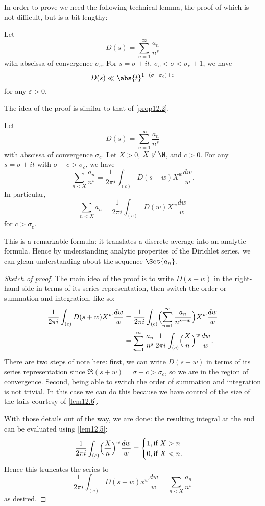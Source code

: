 In order to prove  we need the following technical lemma, the proof of which is not difficult, but is a bit lengthy:

\begin{lemma}\label{lem12.6}
	Let
	\[
		D(s) = \sum_{n = 1}^\infty \frac{a_n}{n^s}
	\]
	with abscissa of convergence $\sigma_c$.
	For $s = \sigma + i t$, $\sigma_c < \sigma < \sigma_c + 1$, we have
	\[
		D(s) \ll \abs{t}^{1 - (\sigma - \sigma_c) + \varepsilon}
	\]
	for any $\varepsilon > 0$.
\end{lemma}

The idea of the proof is similar to that of \autoref{prop12.2}.

\begin{theorem}\label{thm12.7}
	Let
	\[
		D(s) = \sum_{n = 1}^\infty \frac{a_n}{n^s}
	\]
	with abscissa of convergence $\sigma_c$.
	Let $X > 0$, $X \not\in \N$, and $c > 0$.
	For any $s = \sigma + i t$ with $\sigma + c > \sigma_c$, we have
	\[
		\sum_{n < X} \frac{a_n}{n^s} = \frac{1}{2 \pi i} \int_{(c)} D(s + w) X^w \frac{d w}{w}.
	\]
	In particular,
	\[
		\sum_{n < X} a_n = \frac{1}{2 \pi i} \int_{(c)} D(w) X^w \frac{d w}{w}
	\]
	for $c > \sigma_c$.
\end{theorem}

This is a remarkable formula: it translates a discrete average into an analytic formula.
Hence by understanding analytic properties of the Dirichlet series, we can glean understanding about the sequence $\Set{a_n}$.

\begin{proof}[Sketch of proof]
	The main idea of the proof is to write $D(s + w)$ in the right-hand side in terms of its series representation, then switch the order or summation and integration, like so:
	\begin{align*}
		\frac{1}{2 \pi i} \int_{(c)} D(s + w) X^w \frac{d w}{w} &= \frac{1}{2 \pi i} \int_{(c)} \Bigl( \sum_{n = 1}^\infty \frac{a_n}{n^{s + w}} \Bigr) X^w \frac{d w}{w} \\
		&= \sum_{n = 1}^\infty \frac{a_n}{n^s} \frac{1}{2 \pi i} \int_{(c)} \Bigl( \frac{X}{n} \Bigr)^w \frac{d w}{w}.
	\end{align*}
	There are two steps of note here: first, we can write $D(s + w)$ in terms of its series representation since $\Re(s + w) = \sigma + c > \sigma_c$, so we are in the region of convergence.
	Second, being able to switch the order of summation and integration is not trivial.
	In this case we can do this because we have control of the size of the tails courtesy of \autoref{lem12.6}.

	With those details out of the way, we are done: the resulting integral at the end can be evaluated using \autoref{lem12.5}:
	\[
		\frac{1}{2 \pi i} \int_{(c)} \Bigl( \frac{X}{n} \Bigr)^w \frac{d w}{w} = \begin{cases}
			1, \text{if $X > n$} \\
			0, \text{if $X < n$}.
		\end{cases}
	\]
	Hence this truncates the series to
	\[
		\frac{1}{2 \pi i} \int_{(c)} D(s + w) x^w \frac{d w}{w} = \sum_{n < X} \frac{a_n}{n^s}
	\]
	as desired.
\end{proof}

